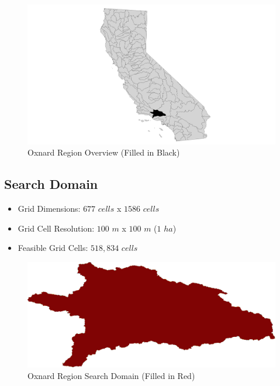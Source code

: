         \begin{figure}[!h]
            \begin{center}
            \includegraphics[width=5.5in]{figures/Oxnard_Overview.png}   
            \caption{Oxnard Region Overview (Filled in Black)}
            \label{fig:Ooverview}
            \end{center}
        \end{figure}

    \subsection{Search Domain}
    
    \begin{itemize}
      \setlength{\itemsep}{0cm}
      \setlength{\parskip}{0cm}
        \item Grid Dimensions: $677$ $cells$ x $1586$ $cells$
        \item Grid Cell Resolution: $100$ $m$ x $100$ $m$ ($1$ $ha$)
        \item Feasible Grid Cells: $518,834$ $cells$
    \end{itemize}
    
        \begin{figure}[!h]
            \begin{center}
            \includegraphics[width=5.5in]{figures/Oxnard_SearchDomain.png}   
            \caption{Oxnard Region Search Domain (Filled in Red)}
            \label{fig:Odomain}
            \end{center}
        \end{figure}
        
